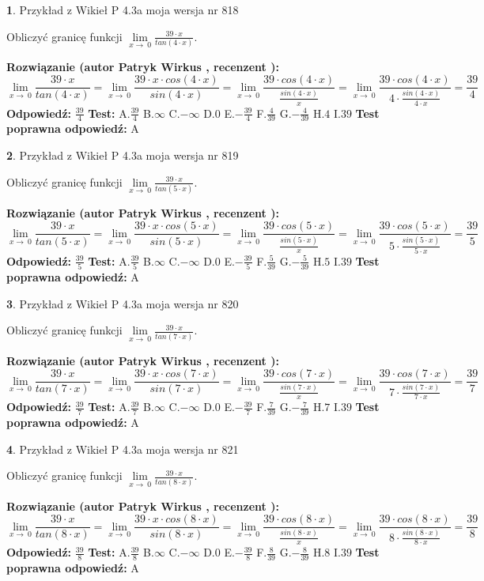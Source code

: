 \documentclass[12pt, a4paper]{article}
\theoremstyle{definition} %
\newtheorem{zad}{}
\newcommand{\zadStart}[1]{\begin{zad}#1\newline}
\newcommand{\zadStop}{\end{zad}}
\newcommand{\rozwStart}[2]{\noindent \textbf{Rozwiązanie (autor #1 , recenzent #2): }\newline}
\newcommand{\rozwStop}{\newline}
\newcommand{\odpStart}{\noindent \textbf{Odpowiedź:}\newline}
\newcommand{\odpStop}{\newline}
\newcommand{\testStart}{\noindent \textbf{Test:}\newline}
\newcommand{\testStop}{\newline}
\newcommand{\kluczStart}{\noindent \textbf{Test poprawna odpowiedź:}\newline}
\newcommand{\kluczStop}{\newline}
\begin{document}
\zadStart{Przykład z Wikieł P 4.3a moja wersja nr 818}


Obliczyć granicę funkcji $\lim\limits_{x\to\ 0}\frac{39 \cdot x}{tan(4 \cdot x)}$.
\zadStop
\rozwStart{Patryk Wirkus}{}
$$\lim\limits_{x\to\ 0}\frac{39 \cdot x}{tan(4 \cdot x)}=\lim\limits_{x\to\ 0}\frac{39 \cdot x \cdot cos(4 \cdot x)}{sin(4 \cdot x)}=\lim\limits_{x\to\ 0}\frac{39 \cdot cos(4 \cdot x)}{\frac{sin(4 \cdot x)}{x}}=\lim\limits_{x\to\ 0}\frac{39 \cdot cos(4 \cdot x)}{4 \cdot \frac{sin(4 \cdot x)}{4 \cdot x}} = \frac{39}{4}$$
\rozwStop
\odpStart
$\frac{39}{4}$
\odpStop
\testStart
A.$\frac{39}{4}$
B.$\infty$
C.$-\infty$
D.$0$
E.$-\frac{39}{4}$
F.$\frac{4}{39}$
G.$-\frac{4}{39}$
H.$4$
I.$39$
\testStop
\kluczStart
A
\kluczStop



\zadStart{Przykład z Wikieł P 4.3a moja wersja nr 819}


Obliczyć granicę funkcji $\lim\limits_{x\to\ 0}\frac{39 \cdot x}{tan(5 \cdot x)}$.
\zadStop
\rozwStart{Patryk Wirkus}{}
$$\lim\limits_{x\to\ 0}\frac{39 \cdot x}{tan(5 \cdot x)}=\lim\limits_{x\to\ 0}\frac{39 \cdot x \cdot cos(5 \cdot x)}{sin(5 \cdot x)}=\lim\limits_{x\to\ 0}\frac{39 \cdot cos(5 \cdot x)}{\frac{sin(5 \cdot x)}{x}}=\lim\limits_{x\to\ 0}\frac{39 \cdot cos(5 \cdot x)}{5 \cdot \frac{sin(5 \cdot x)}{5 \cdot x}} = \frac{39}{5}$$
\rozwStop
\odpStart
$\frac{39}{5}$
\odpStop
\testStart
A.$\frac{39}{5}$
B.$\infty$
C.$-\infty$
D.$0$
E.$-\frac{39}{5}$
F.$\frac{5}{39}$
G.$-\frac{5}{39}$
H.$5$
I.$39$
\testStop
\kluczStart
A
\kluczStop



\zadStart{Przykład z Wikieł P 4.3a moja wersja nr 820}


Obliczyć granicę funkcji $\lim\limits_{x\to\ 0}\frac{39 \cdot x}{tan(7 \cdot x)}$.
\zadStop
\rozwStart{Patryk Wirkus}{}
$$\lim\limits_{x\to\ 0}\frac{39 \cdot x}{tan(7 \cdot x)}=\lim\limits_{x\to\ 0}\frac{39 \cdot x \cdot cos(7 \cdot x)}{sin(7 \cdot x)}=\lim\limits_{x\to\ 0}\frac{39 \cdot cos(7 \cdot x)}{\frac{sin(7 \cdot x)}{x}}=\lim\limits_{x\to\ 0}\frac{39 \cdot cos(7 \cdot x)}{7 \cdot \frac{sin(7 \cdot x)}{7 \cdot x}} = \frac{39}{7}$$
\rozwStop
\odpStart
$\frac{39}{7}$
\odpStop
\testStart
A.$\frac{39}{7}$
B.$\infty$
C.$-\infty$
D.$0$
E.$-\frac{39}{7}$
F.$\frac{7}{39}$
G.$-\frac{7}{39}$
H.$7$
I.$39$
\testStop
\kluczStart
A
\kluczStop



\zadStart{Przykład z Wikieł P 4.3a moja wersja nr 821}


Obliczyć granicę funkcji $\lim\limits_{x\to\ 0}\frac{39 \cdot x}{tan(8 \cdot x)}$.
\zadStop
\rozwStart{Patryk Wirkus}{}
$$\lim\limits_{x\to\ 0}\frac{39 \cdot x}{tan(8 \cdot x)}=\lim\limits_{x\to\ 0}\frac{39 \cdot x \cdot cos(8 \cdot x)}{sin(8 \cdot x)}=\lim\limits_{x\to\ 0}\frac{39 \cdot cos(8 \cdot x)}{\frac{sin(8 \cdot x)}{x}}=\lim\limits_{x\to\ 0}\frac{39 \cdot cos(8 \cdot x)}{8 \cdot \frac{sin(8 \cdot x)}{8 \cdot x}} = \frac{39}{8}$$
\rozwStop
\odpStart
$\frac{39}{8}$
\odpStop
\testStart
A.$\frac{39}{8}$
B.$\infty$
C.$-\infty$
D.$0$
E.$-\frac{39}{8}$
F.$\frac{8}{39}$
G.$-\frac{8}{39}$
H.$8$
I.$39$
\testStop
\kluczStart
A
\kluczStop
\end{document}
